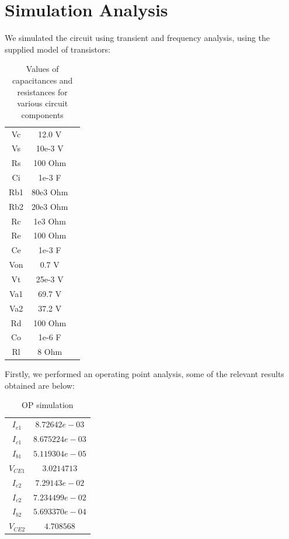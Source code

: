 \section{Simulation Analysis}
\label{sec:simulation}

We simulated the circuit using transient and frequency analysis, using the supplied model of transistors:

\begin{table}[H]
\addtolength{\tabcolsep}{-4pt}
\caption{Values of capacitances and resistances for various circuit components}
\vspace{-3mm}
\begin{tabular}{|c|c|c|}
\hline
Vc & 12.0 V\\
Vs & 10e-3 V\\
Rs & 100 Ohm\\
Ci & 1e-3 F\\
Rb1& 80e3 Ohm\\
Rb2 &20e3 Ohm\\
Rc & 1e3 Ohm\\
Re &100 Ohm\\
Ce & 1e-3 F\\
Von&0.7 V\\
Vt&25e-3 V\\
Va1&69.7 V\\
Va2&37.2 V\\
Rd & 100 Ohm\\
Co & 1e-6 F\\
Rl & 8 Ohm\\
\hline
\end{tabular}
\label{tab:Components}
\end{table}

\par

Firstly, we performed an operating point analysis, some of the relevant results obtained are below:

\begin{table}[H]
    \addtolength{\tabcolsep}{-4pt}
    \caption{OP simulation}
    \vspace{-3mm}
    \begin{tabular}{|c|c|}
    \hline
    $I_{e1}$ & $8.72642e-03$\\
    $I_{c1}$ & $8.675224e-03$\\
    $I_{b1}$ & $5.119304e-05$\\  
    $V_{CE1}$ & $3.0214713$\\
    $I_{e2}$ & $7.29143e-02$\\
    $I_{c2}$ & $7.234499e-02$\\
    $I_{b2}$ & $5.693370e-04$\\  
    $V_{CE2}$ & $4.708568$\\
    \hline
    \end{tabular}
    \label{tab:OP_sim}
\end{table}

